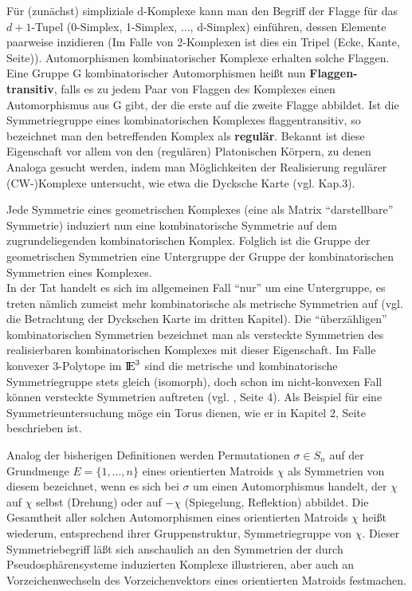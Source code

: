 Für (zunächst) simpliziale d-Komplexe kann man den Begriff der Flagge
 für das $d+1$-Tupel (0-Simplex, 1-Simplex, $\ldots$, d-Simplex)
einführen, dessen Elemente paarweise inzidieren (Im Falle von 2-Kom\-plexen
ist dies ein Tripel (Ecke, Kante, Seite)). Automorphismen kombinatorischer
Komplexe\label{flag} erhalten solche Flaggen. Eine Gruppe G kombinatorischer
Automorphismen heißt nun {\bf Flaggen-transitiv},
falls es zu jedem Paar von Flaggen des Komplexes einen Automorphismus aus G
gibt, der die erste auf die zweite Flagge abbildet. Ist die Symmetriegruppe
eines kombinatorischen Komplexes flaggentransitiv, so bezeichnet man den
betreffenden Komplex als {\bf regulär}.
Bekannt ist diese Eigenschaft vor allem von den (regulären) Platonischen
Körpern, zu denen Analoga gesucht werden, indem man Möglichkeiten der
Realisierung regulärer (CW-)Komplexe untersucht, wie etwa die Dycksche Karte
(vgl. Kap.3).

Jede Symmetrie eines geometrischen Komplexes (eine als Matrix "`darstellbare"'
Symmetrie) induziert nun eine kombinatorische Symmetrie auf dem
zugrundeliegenden kombinatorischen Komplex. Folglich ist die Gruppe der
geometrischen Symmetrien eine Untergruppe der Gruppe der kombinatorischen
Symmetrien eines Komplexes.\\
In der Tat handelt es sich im allgemeinen Fall "`nur"' um eine Untergruppe, es
treten nämlich zumeist mehr kombinatorische als metrische Symmetrien auf (vgl.
die Betrachtung der Dyckschen Karte im dritten Kapitel). Die "`überzähligen"'
kombinatorischen Symmetrien bezeichnet man als versteckte Symmetrien
 des realisierbaren kombinatorischen Komplexes mit
dieser Eigenschaft. Im Falle konvexer 3-Polytope im $\mbox{$\rm I\!E$}^3$ sind die metrische
und kombinatorische Symmetriegruppe stets gleich (isomorph), doch schon im
nicht-konvexen Fall können versteckte Symmetrien auftreten (vgl. \cite{Bo:91},
Seite 4). Als Beispiel für eine Symmetrieuntersuchung möge ein Torus dienen,
wie er in Kapitel 2, Seite \pageref{torus1} beschrieben ist.

Analog der bisherigen Definitionen werden Permutationen $\sigma\in S_n$ auf
der Grundmenge $E=\{1,\ldots,n\}$ eines orientierten Matroids $\chi$ als
Symmetrien von diesem bezeichnet, wenn es sich bei $\sigma$ um einen
Automorphismus handelt, der $\chi$ auf $\chi$ selbst (Drehung) oder
auf $-\chi$ (Spiegelung, Reflektion) abbildet. Die Gesamtheit aller
solchen Automorphismen eines orientierten Matroids $\chi$ heißt wiederum,
entsprechend ihrer Gruppenstruktur, Symmetriegruppe von $\chi$.
 Dieser Symmetriebegriff
läßt sich anschaulich an den Symmetrien der durch Pseudosphärensysteme
induzierten Komplexe illustrieren, aber auch an Vorzeichenwechseln des
Vorzeichenvektors eines orientierten Matroids festmachen.

